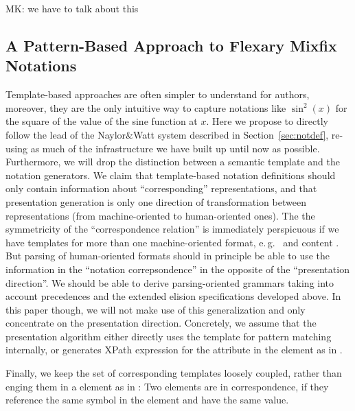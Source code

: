 \begin{newpart}{MK: we have to talk about this}
  \subsection{A Pattern-Based Approach to Flexary Mixfix Notations}

%


  Template-based approaches are often simpler to understand for authors, moreover, they
  are the only intuitive way to capture notations like $\sin^2(x)$ for the square of the
  value of the sine function at $x$. Here we propose to directly follow the lead of the
  Naylor\&Watt system described in Section~\ref{sec:notdef}, re-using as much of the
  infrastructure we have built up until now as possible. Furthermore, we will drop the
  distinction between a semantic template and the notation generators. We claim that
  template-based notation definitions should only contain information about
  ``corresponding'' representations, and that presentation generation is only one
  direction of transformation between representations (from machine-oriented to
  human-oriented ones). The the symmetricity of the ``correspondence relation'' is
  immediately perspicuous if we have templates for more than one machine-oriented format,
  e.\,g.\ {\openmath} and content {\mathml}. But parsing of human-oriented formats should in
  principle be able to use the information in the ``notation correpsondence'' in the
  opposite of the ``presentation direction''. We should be able to derive parsing-oriented
  grammars taking into account precedences and the extended elision specifications
  developed above. In this paper though, we will not make use of this generalization and
  only concentrate on the presentation direction. Concretely, we assume that the
  presentation algorithm either directly uses the {\openmath} template for pattern
  matching internally, or generates XPath expression for the
  {} attribute in the {}
  element as in {}.


  Finally, we keep the set of corresponding templates loosely coupled, rather than enging
  them in a {} element as in {}: Two
  {} elements are in correspondence, if they reference the same
  symbol in the {} element and have the same
  {} value.


\end{newpart}
